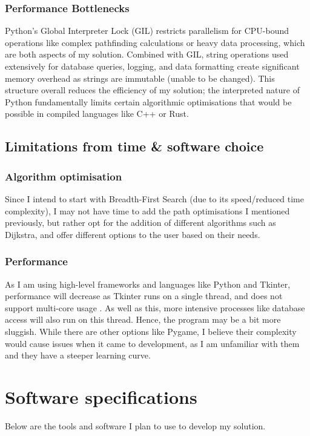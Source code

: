 \subsubsection{Performance Bottlenecks}
Python's Global Interpreter Lock (GIL) \cite{ajitsaria_python_gil} restricts parallelism for CPU-bound operations like complex pathfinding calculations or heavy data processing, which are both aspects of my solution. Combined with GIL, string operations used extensively for database queries, logging, and data formatting create significant memory overhead as strings are immutable (unable to be changed)\cite{dev_python_strings}. This structure overall reduces the efficiency of my solution; the interpreted nature of Python fundamentally limits certain algorithmic optimisations that would be possible in compiled languages like C++ or Rust.

\subsection{Limitations from time \& software choice}

\subsubsection{Algorithm optimisation}

Since I intend to start with Breadth-First Search (due to its speed/reduced time complexity), I may not have time to add the path optimisations I mentioned previously, but rather opt for the addition of different algorithms such as Dijkstra, and offer different options to the user based on their needs.

\subsubsection{Performance}

As I am using high-level frameworks and languages like Python and Tkinter, performance will decrease as Tkinter runs on a single thread, and does not support multi-core usage \cite{python_tkinter}. As well as this, more intensive processes like database access will also run on this thread. Hence, the program may be a bit more sluggish. While there are other options like Pygame, I believe their complexity would cause issues when it came to development, as I am unfamiliar with them and they have a steeper learning curve.


\section{Software specifications}
Below are the tools and software I plan to use to develop my solution.

